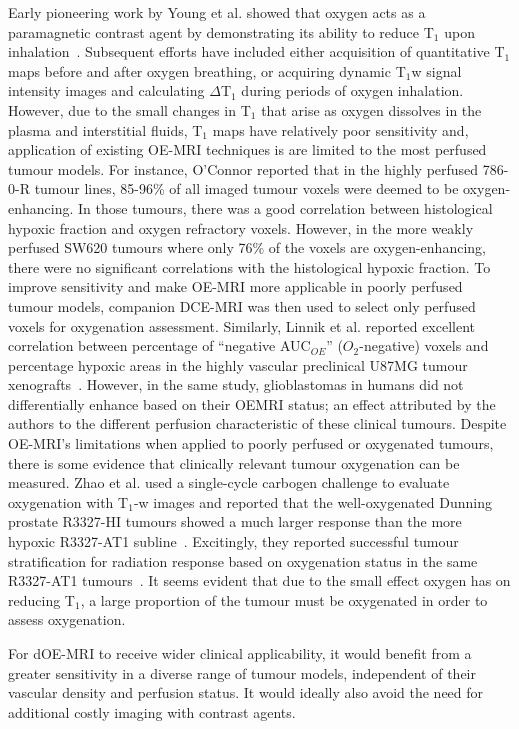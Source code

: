 Early pioneering work by Young et al.
showed that oxygen acts as a paramagnetic contrast agent by demonstrating its ability to reduce T$_1$ upon inhalation~\cite{Young:1981vf}.
Subsequent efforts have included either acquisition of quantitative T$_1$ maps before and after oxygen breathing, or acquiring dynamic T$_1$w signal intensity images and calculating $\Delta$T$_1$ during periods of oxygen inhalation.
However, due to the small changes in T$_1$ that arise as oxygen dissolves in the plasma and interstitial fluids, T$_1$ maps have relatively poor sensitivity and, application of existing OE-MRI techniques is are limited to the most perfused tumour models.
For instance, O'Connor reported that in the highly perfused 786-0-R tumour lines, 85-96\% of all imaged tumour voxels were deemed to be oxygen-enhancing.
In those tumours, there was a good correlation between histological hypoxic fraction and oxygen refractory voxels.
However, in the more weakly perfused SW620 tumours where only 76\% of the voxels are oxygen-enhancing, there were no significant correlations with the histological hypoxic fraction.
To improve sensitivity and make OE-MRI more applicable in poorly perfused tumour models, companion DCE-MRI was then used to select only perfused voxels for oxygenation assessment.
Similarly, Linnik et al.
reported excellent correlation between percentage of ``negative AUC$_{OE}$'' ($O_2$-negative) voxels and percentage hypoxic areas in the highly vascular preclinical U87MG tumour xenografts~\cite{Linnik:2013hf}.
However, in the same study, glioblastomas in humans did not differentially enhance based on their OEMRI status; an effect attributed by the authors to the different perfusion characteristic of these clinical tumours.
Despite OE-MRI's limitations when applied to poorly perfused or oxygenated tumours, there is some evidence that clinically relevant tumour oxygenation can be measured.
Zhao et al. used a single-cycle carbogen challenge to evaluate oxygenation with T$_1$-w images and reported that the well-oxygenated Dunning prostate R3327-HI tumours showed a much larger response than the more hypoxic R3327-AT1 subline~\cite{Zhao:2015ez}.
Excitingly, they reported successful tumour stratification for radiation response based on oxygenation status in the same R3327-AT1 tumours~\cite{Hallac:2014cb}.
It seems evident that due to the small effect oxygen has on reducing T$_1$, a large proportion of the tumour must be oxygenated in order to assess oxygenation.

For dOE-MRI to receive wider clinical applicability, it would benefit from a greater sensitivity in a diverse range of tumour models, independent of their vascular density and perfusion status.
It would ideally also avoid the need for additional costly imaging with contrast agents.

